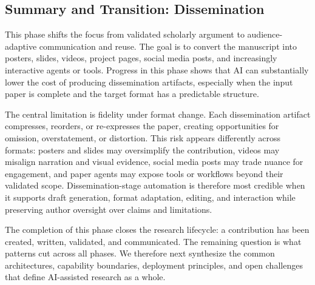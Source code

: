 \subsection{Summary and Transition: Dissemination}
\label{sec:dissemination_summary}

This phase shifts the focus from validated scholarly argument to audience-adaptive communication and reuse. The goal is to convert the manuscript into posters, slides, videos, project pages, social media posts, and increasingly interactive agents or tools. Progress in this phase shows that AI can substantially lower the cost of producing dissemination artifacts, especially when the input paper is complete and the target format has a predictable structure.

The central limitation is fidelity under format change. Each dissemination artifact compresses, reorders, or re-expresses the paper, creating opportunities for omission, overstatement, or distortion. This risk appears differently across formats: posters and slides may oversimplify the contribution, videos may misalign narration and visual evidence, social media posts may trade nuance for engagement, and paper agents may expose tools or workflows beyond their validated scope. Dissemination-stage automation is therefore most credible when it supports draft generation, format adaptation, editing, and interaction while preserving author oversight over claims and limitations.

The completion of this phase closes the research lifecycle: a contribution has been created, written, validated, and communicated. The remaining question is what patterns cut across all phases. We therefore next synthesize the common architectures, capability boundaries, deployment principles, and open challenges that define AI-assisted research as a whole.
